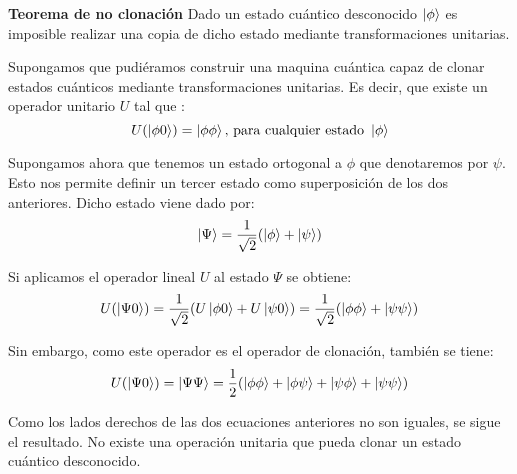 \begin{thm} \textbf{Teorema de no clonación}
Dado un estado cuántico desconocido $\left|\phi\right\rangle$ es imposible realizar una copia de dicho estado mediante transformaciones unitarias.
\end{thm}

Supongamos que pudiéramos construir una maquina cuántica capaz de clonar estados cuánticos mediante transformaciones unitarias. Es decir, que existe un operador unitario $U$  tal que :
\begin{equation}
U(\left|\phi 0\right\rangle) = \left|\phi\phi\right\rangle \textrm{, para cualquier estado } \left|\phi\right\rangle 
\end{equation}

Supongamos ahora que tenemos un estado ortogonal a $\phi$ que denotaremos por $\psi$. Esto nos permite definir un tercer estado como superposición de los dos anteriores. Dicho estado viene dado por:
\begin{equation}
\left|\Psi\right\rangle = \dfrac{1}{\sqrt{2}}(\left|\phi\right\rangle + \left|\psi\right\rangle)
\end{equation}

Si aplicamos el operador lineal $U$ al estado $\Psi$ se obtiene:
\begin{equation}
U(\left|\Psi 0\right\rangle)= \dfrac{1}{\sqrt{2}}(U\left|\phi 0\right\rangle + U\left|\psi 0\right\rangle) = \dfrac{1}{\sqrt{2}}(\left|\phi\phi\right\rangle + \left|\psi\psi\right\rangle)
\end{equation}

Sin embargo, como este operador es el operador de clonación, también se tiene:
\begin{equation}
U(\left|\Psi 0\right\rangle)= \left|\Psi\Psi\right\rangle = \dfrac{1}{2}(\left|\phi\phi\right\rangle + \left|\phi\psi\right\rangle + \left|\psi\phi\right\rangle + \left|\psi\psi\right\rangle)
\end{equation}

Como los lados derechos de las dos ecuaciones anteriores no son iguales, se sigue el resultado. No existe una operación unitaria que pueda clonar un estado cuántico desconocido.